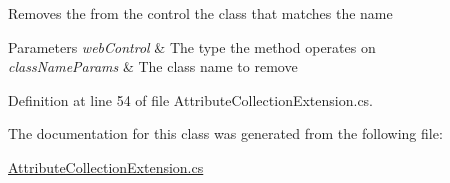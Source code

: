 Removes the from the control the class that matches the name 


\begin{DoxyParams}{Parameters}
{\em web\+Control} & The type the method operates on\\
\hline
{\em class\+Name\+Params} & The class name to remove\\
\hline
\end{DoxyParams}


Definition at line 54 of file Attribute\+Collection\+Extension.\+cs.



The documentation for this class was generated from the following file\+:\begin{DoxyCompactItemize}
\item 
\mbox{\hyperlink{AttributeCollectionExtension_8cs}{Attribute\+Collection\+Extension.\+cs}}\end{DoxyCompactItemize}
